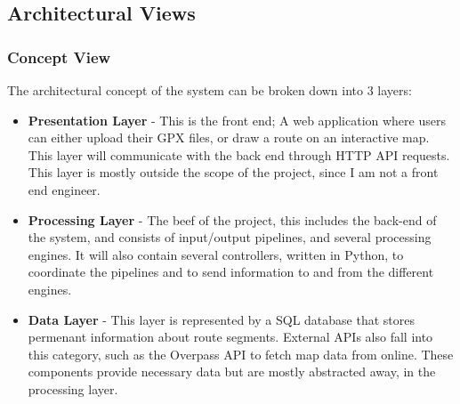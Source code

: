 \documentclass[11pt,twoside]{report}
\begin{document}
\subsection{Architectural Views}
\subsubsection{Concept View}
The architectural concept of the system can be broken down into 3 layers:
\begin{itemize}
	\item \textbf{Presentation Layer} - This is the front end; A web application where users can either upload their GPX
	      files, or draw a route on an interactive map. This layer will communicate with the back end through HTTP API requests. This layer is mostly
	      outside the scope of the project, since I am not a front end engineer.
	\item \textbf{Processing Layer} - The beef of the project, this includes the back-end of the system, and consists of input/output pipelines,
	      and several processing engines. It will also contain several controllers, written in Python, to coordinate the pipelines and to send
	      information to and from the different engines.
	\item \textbf{Data Layer} - This layer is represented by a SQL database that stores permenant information about route segments. External APIs also
	      fall into this category, such as the Overpass API \citep{OverpassAPI} to fetch map data from online. These components provide necessary data but are mostly abstracted
	      away, in the processing layer.
\end{itemize}
\end{document}
